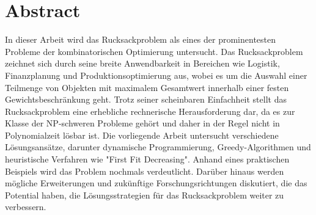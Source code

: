 \documentclass[12pt]{report}
\begin{document}
\pagestyle{plain}
\fancyhead{}


\fancyhead[C]{\nouppercase\leftmark}

\renewcommand{\footrulewidth}{0.4pt} %


\renewcommand{\chaptermark}[1]{\markboth{#1}{}} 

\newpage
\chapter*{Abstract}
In dieser Arbeit wird das Rucksackproblem als eines der prominentesten Probleme der kombinatorischen Optimierung untersucht. Das Rucksackproblem zeichnet sich durch seine breite Anwendbarkeit in Bereichen wie Logistik, Finanzplanung und Produktionsoptimierung aus, wobei es um die Auswahl einer Teilmenge von Objekten mit maximalem Gesamtwert innerhalb einer festen Gewichtsbeschränkung geht. Trotz seiner scheinbaren Einfachheit stellt das Rucksackproblem eine erhebliche rechnerische Herausforderung dar, da es zur Klasse der NP-schweren Probleme gehört und daher in der Regel nicht in Polynomialzeit lösbar ist. Die vorliegende Arbeit untersucht verschiedene Lösungsansätze, darunter dynamische Programmierung, Greedy-Algorithmen und heuristische Verfahren wie "First Fit Decreasing". Anhand eines praktischen Beispiels wird das Problem nochmals verdeutlicht. Darüber hinaus werden mögliche Erweiterungen und zukünftige Forschungsrichtungen diskutiert, die das Potential haben, die Lösungsstrategien für das Rucksackproblem weiter zu verbessern.
\newpage

\end{document}
